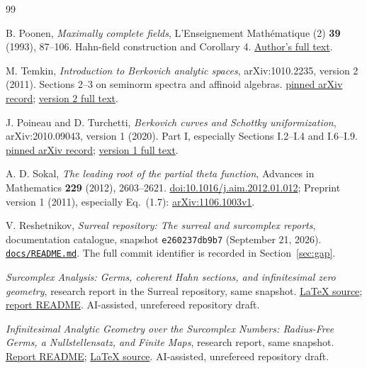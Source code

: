 \documentclass[11pt,a4paper]{article}
\numberwithin{equation}{section}
\theoremstyle{definition}
\theoremstyle{remark}
\newcommand{\repobase}{https://github.com/VladimirReshetnikov/Surreal/blob/e260237db9b71da8b74a0c13c8e6355119091100/}
\begin{document}
\begin{thebibliography}{99}

B. Poonen, \emph{Maximally complete fields},
L'Enseignement Math\'ematique (2) \textbf{39} (1993), 87--106.
Hahn-field construction and Corollary 4.
\href{https://math.mit.edu/~poonen/papers/amsval.pdf}{Author's full text}.

M. Temkin, \emph{Introduction to Berkovich analytic spaces},
arXiv:1010.2235, version 2 (2011).
Sections 2--3 on seminorm spectra and affinoid algebras.
\href{https://arxiv.org/abs/1010.2235v2}{pinned arXiv record};
\href{https://arxiv.org/pdf/1010.2235v2}{version 2 full text}.

J. Poineau and D. Turchetti, \emph{Berkovich curves and Schottky uniformization},
arXiv:2010.09043, version 1 (2020).
Part I, especially Sections I.2--I.4 and I.6--I.9.
\href{https://arxiv.org/abs/2010.09043v1}{pinned arXiv record};
\href{https://arxiv.org/pdf/2010.09043v1}{version 1 full text}.

A. D. Sokal, \emph{The leading root of the partial theta function},
Advances in Mathematics \textbf{229} (2012), 2603--2621.
\href{https://doi.org/10.1016/j.aim.2012.01.012}{doi:10.1016/j.aim.2012.01.012};
Preprint version 1 (2011), especially Eq.~(1.7):
\href{https://arxiv.org/abs/1106.1003v1}{arXiv:1106.1003v1}.

V. Reshetnikov, \emph{Surreal repository: The surreal and surcomplex reports},
documentation catalogue, snapshot \texttt{e260237db9b7} (September 21, 2026).
\href{\repobase docs/README.md}{\texttt{docs/README.md}}.
The full commit identifier is recorded in Section~\ref{sec:gap}.

\emph{Surcomplex Analysis: Germs, coherent Hahn sections, and infinitesimal
zero geometry}, research report in the Surreal repository, same snapshot.
\href{\repobase docs/surcomplex/analysis/article.tex}{LaTeX source};
\href{\repobase docs/surcomplex/analysis/README.md}{report README}.
AI-assisted, unrefereed repository draft.

\emph{Infinitesimal Analytic Geometry over the Surcomplex Numbers:
Radius-Free Germs, a Nullstellensatz, and Finite Maps}, research report,
same snapshot.
\href{\repobase docs/surcomplex/analytic-geometry/README.md}{Report README};
\href{\repobase docs/surcomplex/analytic-geometry/article.tex}{LaTeX source}.
AI-assisted, unrefereed repository draft.


\end{thebibliography}
\end{document}
